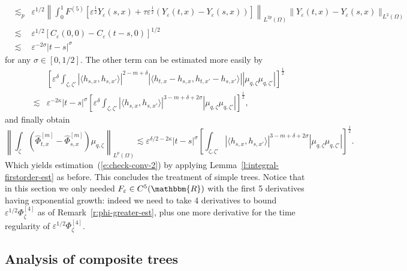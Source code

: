 \begin{eqnarray*}
  & \lesssim_p & \varepsilon^{1 / 2} \left\| \int_0^1 F^{(5)}
  [\varepsilon^{\frac{1}{2}} Y_{\varepsilon} (s, x) + \tau
  \varepsilon^{\frac{1}{2}} (Y_{\varepsilon} (t, x) - Y_{\varepsilon} (s, x))]
  \right\|_{L^{2 p} (\Omega)}  \| Y_{\varepsilon} (t, x) - Y_{\varepsilon} (s,
  x) \|_{L^2 (\Omega)}\\
  & \lesssim & \varepsilon^{1 / 2} [C_{\varepsilon} (0, 0) - C_{\varepsilon}
  (t - s, 0)]^{1 / 2} \\
  & \lesssim & \varepsilon^{- 2 \sigma} | t - s |^{\sigma}
\end{eqnarray*}
for any $\sigma \in [0, 1 / 2]$. The other term can be estimated more easily
by
\begin{eqnarray*}
  &  & \left[ \varepsilon^{\delta} \int_{\zeta, \zeta'} | \langle h_{s, x},
  h_{s, x'} \rangle |^{2 - m + \delta} | \langle h_{t, x} - h_{s, x}, h_{t,
  x'} - h_{s, x'} \rangle | | \mu_{q, \zeta} \mu_{q, \zeta'} |
  \right]^{\frac{1}{2}}\\
  & \lesssim & \varepsilon^{- 2 \kappa} | t - s |^{\sigma} \left[
  \varepsilon^{\delta} \int_{\zeta, \zeta'} | \langle h_{s, x}, h_{s, x'}
  \rangle |^{3 - m + \delta + 2 \sigma} | \mu_{q, \zeta} \mu_{q, \zeta'} |
  \right]^{\frac{1}{2}},
\end{eqnarray*}
and finally obtain
\[ \left\| \int_{\zeta} (\hat{\Phi}^{[m]}_{t, x} - \hat{\Phi}^{[m]}_{s, x})
   \mu_{q, \zeta} \right\|_{L^p (\Omega)} \lesssim \varepsilon^{\delta / 2 - 2
   \kappa} | t - s |^{\sigma} \left[ \int_{\zeta, \zeta'} | \langle h_{s, x},
   h_{s, x'} \rangle |^{3 - m + \delta + 2 \sigma} | \mu_{q, \zeta} \mu_{q,
   \zeta'} | \right]^{\frac{1}{2}} . \]
Which yields estimation~(\ref{e:check-conv-2}) by applying
Lemma~\ref{l:integral-firstorder-est} as before. This concludes the treatment
of simple trees. Notice that in this section we only needed $F_{\varepsilon}
\in C^5 (\mathbbm{R})$ with the first 5 derivatives having exponential growth:
indeed we need to take 4 derivatives to bound $\varepsilon^{1 / 2}
\Phi^{[4]}_{\zeta}$ as of Remark~\ref{r:phi-greater-est}, plus one more
derivative for the time regularity of $\varepsilon^{1 / 2}
\Phi^{[4]}_{\zeta}$.

\subsection{Analysis of composite trees}\label{s:comp-trees-all}

